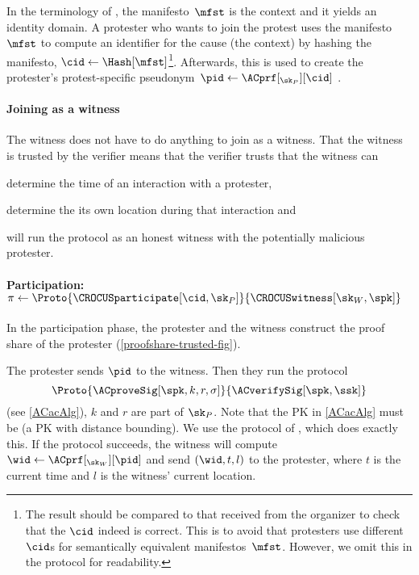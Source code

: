 In the terminology of \textcite{SelfCertifiedSybilFreePseudonyms}, the 
manifesto~\(\mfst\) is the context and it yields an identity domain.
A protester who wants to join the protest uses the manifesto~\(\mfst\) to
compute an identifier for the cause (the context) by hashing the manifesto,
\(\cid\gets \Hash[\mfst]\)\footnote{%
  The result should be compared to that received from the organizer to check 
  that the \(\cid\) indeed is correct.
  This is to avoid that protesters use different \(\cid\)s for semantically 
  equivalent manifestos~\(\mfst\).
  However, we omit this in the protocol for readability.
}.
Afterwards, this is used to create the protester's protest-specific 
pseudonym~\(\pid\gets \ACprf[_{\sk_P}][\cid]\)%
.


\paragraph*{Joining as a witness}

The witness does not have to do anything to join as a witness.
That the witness is trusted by the verifier means that the verifier trusts that 
the witness can
\begin{enumerate*}
  \item determine the time of an interaction with a protester,
  \item determine the its own location during that interaction
    and
  \item will run the protocol as an honest witness with the potentially 
    malicious protester.
\end{enumerate*}


\paragraph*{Participation:
  \(\pi\gets
    \Proto{\CROCUSparticipate[\cid, \sk_P]}{\CROCUSwitness[\sk_W, \spk]}\)}

In the participation phase, the protester and 
the witness construct the proof share of the protester (\cref{proofshare-trusted-fig}).

The protester sends \(\pid\) to the witness.
Then they run the protocol \[
  \Proto{\ACproveSig[\spk, k, r, \sigma]}{\ACverifySig[\spk, \ssk]}
\] (see \cref{ACacAlg}), \(k\) and \(r\) are part of \(\sk_P\).
Note that the \acf{PK} in \cref{ACacAlg} must be
 (\ie a \acl{PK} with distance bounding).
We use the protocol of \textcite{DB-Schnorr}, which does exactly this.
If the protocol succeeds, the witness will compute \(\wid \gets 
\ACprf[_{\sk_W}][\pid]\) and send \((\wid, t, l)\) to the protester, where 
\(t\) is the current time and \(l\) is the witness' current location.


